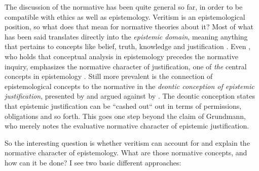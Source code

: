 \documentclass[12pt,numbers=noenddot]{scrartcl}
\begin{document}
The discussion of the normative has been quite general so far, in order to be compatible with ethics as well as epistemology. Veritism is an epistemological position, so what does that mean for normative theories about it? Most of what has been said translates directly into the \emph{epistemic domain}, meaning anything that pertains to concepts like belief, truth, knowledge and justification \autocite{David2001-DAVTAT-7}. Even \textcite[7]{grundmann2008}, who holds that conceptual analysis in epistemology precedes the normative inquiry, emphasizes the normative character of justification, one of \emph{the} central concepts in epistemology \autocite[226]{grundmann2008}. Still more prevalent is the connection of epistemological concepts to the normative in the \emph{deontic conception of epistemic justification}, presented by \textcite{Steup1988-STETDC} and argued against by \textcite{Alston1988-ALSTDC}. The deontic conception states that epistemic justification can be “cashed out“ out in terms of permissions, obligations and so forth. This goes one step beyond the claim of Grundmann, who merely notes the evaluative normative character of epistemic justification.

So the interesting question is whether veritism can account for and explain the normative character of epistemology. What are those normative concepts, and how can it be done? I see two basic different approaches:
\end{document}
